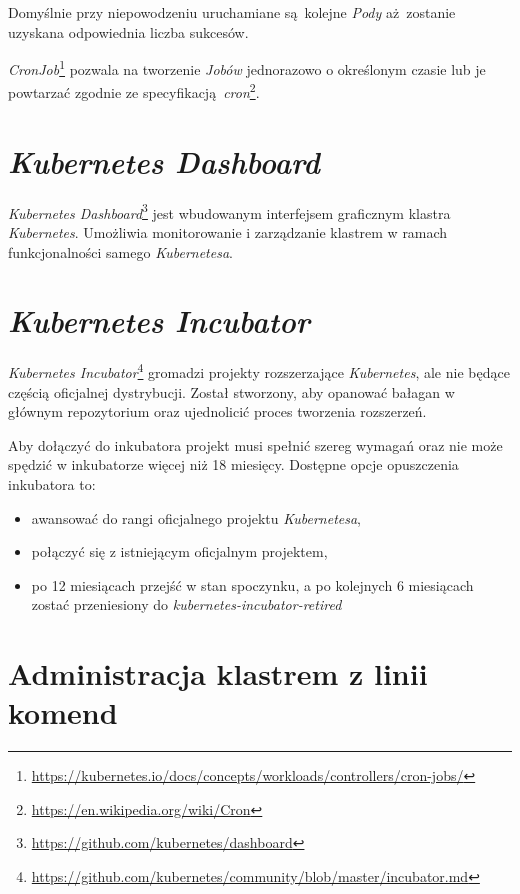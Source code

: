 \documentclass[a4paper,12pt,twoside,openany]{report}
\providecommand{\tightlist}{%
  \setlength{\itemsep}{0pt}\setlength{\parskip}{0pt}}
\DeclareRobustCommand{\href}[2]{#2\footnote{\url{#1}}}
\begin{document}
Domyślnie przy niepowodzeniu uruchamiane są~kolejne \emph{Pody}
aż~zostanie uzyskana odpowiednia liczba sukcesów.

\href{https://kubernetes.io/docs/concepts/workloads/controllers/cron-jobs/}{\emph{CronJob}}
pozwala na tworzenie \emph{Jobów} jednorazowo o określonym czasie lub je
powtarzać zgodnie ze
specyfikacją~\href{https://en.wikipedia.org/wiki/Cron}{\emph{cron}}.

\hypertarget{kubernetes-dashboard}{%
\section{\texorpdfstring{\emph{Kubernetes
Dashboard}}{Kubernetes Dashboard}}\label{kubernetes-dashboard}}

\href{https://github.com/kubernetes/dashboard}{\emph{Kubernetes
Dashboard}} jest wbudowanym interfejsem graficznym klastra
\emph{Kubernetes}. Umożliwia monitorowanie i zarządzanie klastrem w
ramach funkcjonalności samego \emph{Kubernetesa}.

\hypertarget{kubernetes-incubator}{%
\section{\texorpdfstring{\emph{Kubernetes
Incubator}}{Kubernetes Incubator}}\label{kubernetes-incubator}}

\href{https://github.com/kubernetes/community/blob/master/incubator.md}{\emph{Kubernetes
Incubator}} gromadzi projekty rozszerzające \emph{Kubernetes}, ale nie
będące częścią oficjalnej dystrybucji. Został stworzony, aby opanować
bałagan w głównym repozytorium oraz ujednolicić proces tworzenia
rozszerzeń.

Aby dołączyć do inkubatora projekt musi spełnić szereg wymagań oraz nie
może spędzić w inkubatorze więcej niż 18 miesięcy. Dostępne opcje
opuszczenia inkubatora to:

\begin{itemize}
\tightlist
\item
  awansować do rangi oficjalnego projektu \emph{Kubernetesa},
\item
  połączyć się z istniejącym oficjalnym projektem,
\item
  po 12 miesiącach przejść w stan spoczynku, a po kolejnych 6 miesiącach
  zostać przeniesiony do \emph{kubernetes-incubator-retired}
\end{itemize}

\hypertarget{administracja-klastrem-z-linii-komend}{%
\section{Administracja klastrem z linii
komend}\label{administracja-klastrem-z-linii-komend}}
\end{document}
